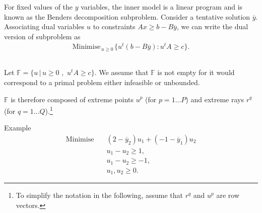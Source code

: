 For fixed values of the $y$ variables, the inner model is a linear program and is known as the Benders decomposition subproblem. Consider a tentative solution $\overline{y}$. Associating dual variables $u$ to constraints $Ax \geq
b-B\overline{y}$, we can write the dual version of  subproblem as
\begin{eqnarray*}
\label{bd3}  \textrm{Minimise}_{\, u\geq 0 \,} \{ u^t(b-B\overline{y}) :
u^tA \geq c\}.
\end{eqnarray*}

\vfill


\newpage

\subsection*{}

Let  $\mathbb{F} = \{ u \, |\, u \geq 0 \,\, , \, \, u^tA \geq c \}$.  We assume that $\mathbb{F}$ is not empty for it would correspond to a primal problem either infeasible or
unbounded. 

$\mathbb{F}$ is therefore composed of extreme points $u^p$ (for
$p=1 \dots P$) and extreme rays $r^q$ (for $q=1 \dots Q$).\footnote{To simplify the notation in the following, assume that $r^q$ and $u^p$ are row vectors.}\\


\begin{bclogo}[logo=\bccrayon]{\small Example }
\small \vspace{-.5cm}
\begin{align*}
\textrm{Minimise} \quad &  (2-\overline{y}_2)u_1 + (-1 - \overline{y}_1)u_2 \\
& u_1 -  u_2  \geq 1, \\
& u_1 -u_2 \geq -1, \\
& u_1, u_2 \geq 0.
\end{align*}

\end{bclogo}




\begin{center}
\end{center}


